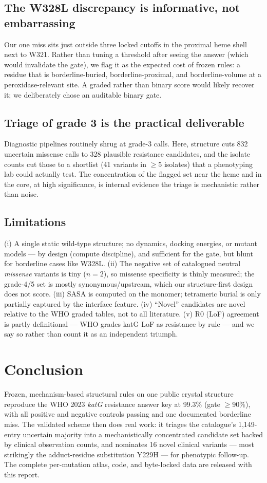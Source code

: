 \documentclass[11pt]{article}
\begin{document}
\subsection{The W328L discrepancy is informative, not embarrassing}
Our one miss sits just outside three locked cutoffs in the proximal heme shell next to W321. Rather than tuning a threshold after seeing the answer (which would invalidate the gate), we flag it as the expected cost of frozen rules: a residue that is borderline-buried, borderline-proximal, and borderline-volume at a peroxidase-relevant site. A graded rather than binary score would likely recover it; we deliberately chose an auditable binary gate.

\subsection{Triage of grade 3 is the practical deliverable}
Diagnostic pipelines routinely shrug at grade-3 calls. Here, structure cuts 832 uncertain missense calls to 328 plausible resistance candidates, and the isolate counts cut those to a shortlist (41 variants in $\geq$5 isolates) that a phenotyping lab could actually test. The concentration of the flagged set near the heme and in the core, at high significance, is internal evidence the triage is mechanistic rather than noise.

\subsection{Limitations}
(i) A single static wild-type structure; no dynamics, docking energies, or mutant models --- by design (compute discipline), and sufficient for the gate, but blunt for borderline cases like W328L. (ii) The negative set of catalogued neutral \emph{missense} variants is tiny ($n=2$), so missense specificity is thinly measured; the grade-4/5 set is mostly synonymous/upstream, which our structure-first design does not score. (iii) SASA is computed on the monomer; tetrameric burial is only partially captured by the interface feature. (iv) ``Novel'' candidates are novel relative to the WHO graded tables, not to all literature. (v) R0 (LoF) agreement is partly definitional --- WHO grades katG LoF as resistance by rule --- and we say so rather than count it as an independent triumph.

\section{Conclusion}
Frozen, mechanism-based structural rules on one public crystal structure reproduce the WHO 2023 \textit{katG} resistance answer key at 99.3\% (gate $\geq$90\%), with all positive and negative controls passing and one documented borderline miss. The validated scheme then does real work: it triages the catalogue's 1,149-entry uncertain majority into a mechanistically concentrated candidate set backed by clinical observation counts, and nominates 16 novel clinical variants --- most strikingly the adduct-residue substitution Y229H --- for phenotypic follow-up. The complete per-mutation atlas, code, and byte-locked data are released with this report.
\end{document}
